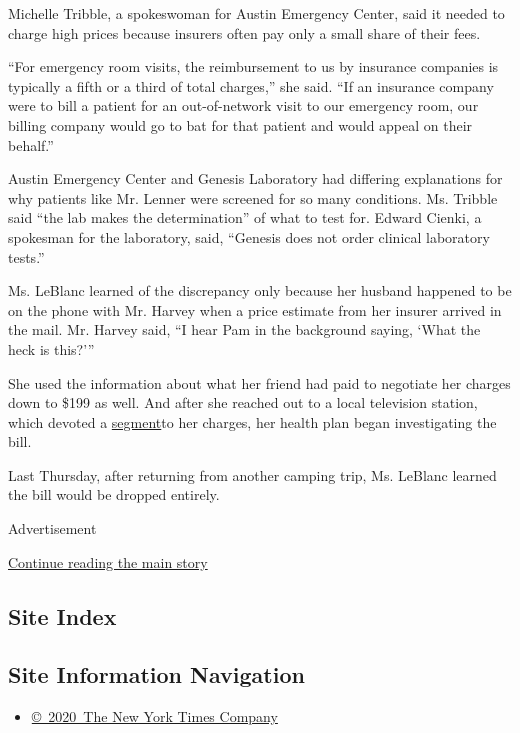 Michelle Tribble, a spokeswoman for Austin Emergency Center, said it
needed to charge high prices because insurers often pay only a small
share of their fees.

``For emergency room visits, the reimbursement to us by insurance
companies is typically a fifth or a third of total charges,'' she said.
``If an insurance company were to bill a patient for an out-of-network
visit to our emergency room, our billing company would go to bat for
that patient and would appeal on their behalf.''

Austin Emergency Center and Genesis Laboratory had differing
explanations for why patients like Mr. Lenner were screened for so many
conditions. Ms. Tribble said ``the lab makes the determination'' of what
to test for. Edward Cienki, a spokesman for the laboratory, said,
``Genesis does not order clinical laboratory tests.''

Ms. LeBlanc learned of the discrepancy only because her husband happened
to be on the phone with Mr. Harvey when a price estimate from her
insurer arrived in the mail. Mr. Harvey said, ``I hear Pam in the
background saying, `What the heck is this?'''

She used the information about what her friend had paid to negotiate her
charges down to \$199 as well. And after she reached out to a local
television station, which devoted a
\href{https://www.kxan.com/investigations/austin-woman-trying-to-sort-out-6400-in-charges-for-one-covid-19-test/}{segment}to
her charges, her health plan began investigating the bill.

Last Thursday, after returning from another camping trip, Ms. LeBlanc
learned the bill would be dropped entirely.

Advertisement

\protect\hyperlink{after-bottom}{Continue reading the main story}

\hypertarget{site-index}{%
\subsection{Site Index}\label{site-index}}

\hypertarget{site-information-navigation}{%
\subsection{Site Information
Navigation}\label{site-information-navigation}}

\begin{itemize}
\tightlist
\item
  \href{https://help.nytimes3xbfgragh.onion/hc/en-us/articles/115014792127-Copyright-notice}{©~2020~The
  New York Times Company}
\end{itemize}

